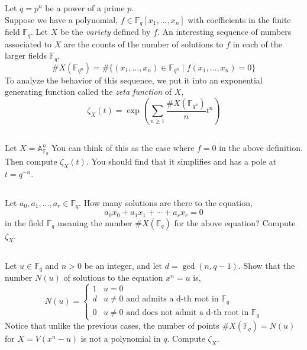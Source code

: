 \documentclass[12pt]{article}
\newcommand{\FF}{\mathbb{F}}
\theoremstyle{remark}
\theoremstyle{definition}
\newcommand{\A}{\mathbb{A}}
\begin{document}
Let $q = p^n$ be a power of a prime $p$. 
\\
Suppose we have a polynomial, $f \in \FF_q[x_1, \dots, x_n]$ with coefficients in the finite field $\FF_q$. Let $X$ be the \textit{variety} defined by $f$. An interesting sequence of numbers associated to $X$ are the counts of the number of solutions to $f$ in each of the larger fields $\FF_q$,
\[ \# X(\FF_{q^n}) = \# \{ (x_1, \dots, x_n) \in \FF_{q^n} \mid f(x_1, \dots, x_n) = 0 \} \]
To analyze the behavior of this sequence, we put it into an exponential generating function called the \textit{zeta function} of $X$,
\[ \zeta_X(t) = \exp{ \left( \sum_{n \ge 1} \frac{\# X(\FF_{q^n})}{n} t^n \right)} \]

\subsection{}

Let $X = \A^n_{\FF_q}$ You can think of this as the case where $f = 0$ in the above definition. Then compute $\zeta_X(t)$. You should find that it simplifies and has a pole at $t = q^{-n}$.


\subsection{}

Let $a_0, a_1, \dots, a_r \in \FF_q$. How many solutions are there to the equation,
\[ a_0 x_0 + a_1 x_1 + \cdots + a_r x_r = 0 \]
in the field $\FF_q$ meaning the number $\# X(\FF_q)$ for the above equation? Compute $\zeta_X$.

\subsection{} \label{problem:roots}

Let $u \in \FF_q$ and $n > 0$ be an integer, and let $d = \gcd(n, q-1)$. Show that the number $N(u)$ of solutions to the equation $x^n = u$ is,
\[ N(u) = \begin{cases}
1 & u = 0
\\
d & u \neq 0 \text{ and admits a d-th root in } \FF_q
\\
0 & u \neq 0 \text{ and does not admit a d-th root in } \FF_q
\end{cases} \]
Notice that unlike the previous cases, the number of points $\# X(\FF_q) = N(u)$ for $X = V(x^n - u)$ is not a polynomial in $q$. Compute $\zeta_X$.


\subsection{} \label{hyperelliptic}
\end{document}
